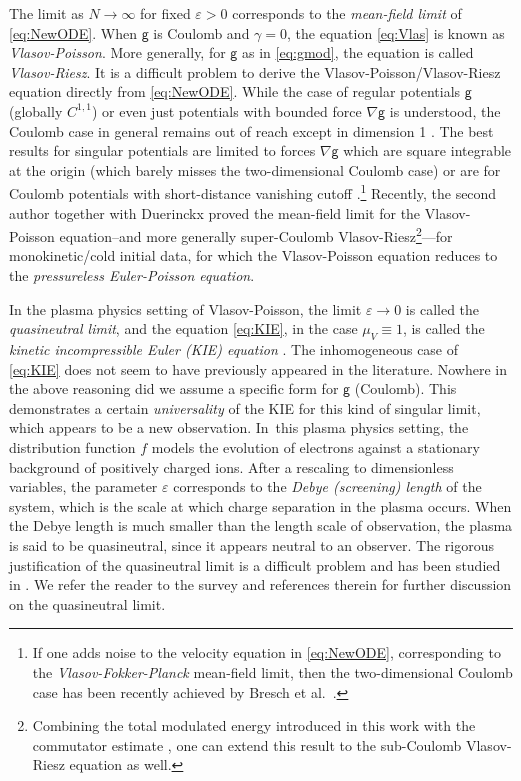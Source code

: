 \documentclass[JEP,XML,SOM,Unicode,published]{cedram}
\theoremstyle{plain}
\theoremstyle{definition}
\let\ga\gamma
\let\vep\varepsilon
\newcommand{\g}{{\mathsf{g}}}
\begin{document}
The limit as $N\to\infty$ for fixed $\vep>0$ corresponds to the \emph{mean-field limit} of \eqref{eq:NewODE}. When $\g$ is Coulomb and $\ga=0$, the equation \eqref{eq:Vlas} is known as \emph{Vlasov-Poisson}. More generally, for $\g$ as in \eqref{eq:gmod}, the equation is called \emph{Vlasov-Riesz}. It is a difficult problem to derive the Vlasov-Poisson/Vlasov-Riesz equation directly from \eqref{eq:NewODE}. While the case of regular potentials $\g$ (\eg globally $C^{1,1}$) \cite{NW1974, BH1977, Dobrushin1979, Duerinckx2021gl} or even just potentials with bounded force $\nabla\g$ \cite{JW2016} is understood, the Coulomb case in general remains out of reach except in dimension 1 \cite{Trocheris1986,Hauray2014}. The best results for singular potentials are limited to forces $\nabla\g$ which are square integrable at the origin \cite{HJ2007, HJ2015, BDJ2024} (which barely misses the two-dimensional Coulomb case) or are for Coulomb potentials with short-distance vanishing cutoff \cite{BP2016, Lazarovici2016, LP2017, Grass2021}.\footnote{If one adds noise to the velocity equation in \eqref{eq:NewODE}, corresponding to the \emph{Vlasov-Fokker-Planck} mean-field limit, then the two-dimensional Coulomb case has been recently achieved by Bresch et al.\ \cite{BJS2022}.} Recently, the second author together with Duerinckx \cite[App.]{Serfaty2020} proved the mean-field limit for the Vlasov-Poisson equation--and more generally super-Coulomb Vlasov-Riesz\footnote{Combining the total modulated energy introduced in this work with the commutator estimate \cite[Prop.\,4.1]{NRS2021}, one can extend this result to the sub-Coulomb Vlasov-Riesz equation as well.}---for monokinetic/cold initial data, for which the Vlasov-Poisson equation reduces to the \emph{pressureless Euler-Poisson equation}.

In the plasma physics setting of Vlasov-Poisson, the limit $\vep\to 0$ is called the \emph{quasineutral limit}, and the equation \eqref{eq:KIE}, in the case $\mu_V\equiv 1$, is called the \emph{kinetic incompressible Euler (KIE) equation} \cite{Brenier1989}. The inhomogeneous case of \eqref{eq:KIE} does not seem to have previously appeared in the literature. Nowhere in the above reasoning did we assume a specific form for $\g$ (\eg Coulomb). This demonstrates a certain \emph{universality} of the KIE for this kind of singular limit, which appears to be a new observation. In~this plasma physics setting, the distribution function $f$ models the evolution of electrons against a stationary background of positively charged ions. After a rescaling to dimensionless variables, the parameter $\vep$ corresponds to the \emph{Debye (screening) length} of the system, which is the scale at which charge separation in the plasma occurs. When the Debye length is much smaller than the length scale of observation, the plasma is said to be quasineutral, since it appears neutral to an observer. The rigorous justification of the quasineutral limit is a difficult problem and has been studied in \cite{BG1994, Grenier1995, Grenier1996,Grenier1999,Brenier2000,Masmoudi2001, HkH2015, HkR2016, HkI2017, HkI2017jde, GpI2018, GpI2020sing}. We refer the reader to the survey \cite{GpI2020qn} and references therein for further discussion on the quasineutral limit.
\end{document}
